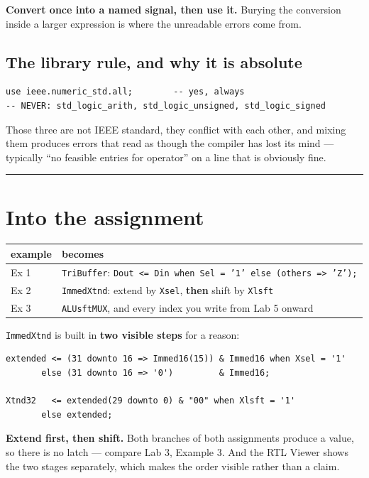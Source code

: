 \documentclass[11pt]{article}
\newcommand{\code}[1]{\texttt{#1}}
\newcommand{\hr}{\vspace{2pt}\hrule\vspace{6pt}}
\begin{document}
\textbf{Convert once into a named signal, then use it.} Burying the conversion
inside a larger expression is where the unreadable errors come from.

\subsection*{The library rule, and why it is absolute}

\begin{lstlisting}
use ieee.numeric_std.all;        -- yes, always
-- NEVER: std_logic_arith, std_logic_unsigned, std_logic_signed
\end{lstlisting}

Those three are not IEEE standard, they conflict with each other, and mixing them
produces errors that read as though the compiler has lost its mind --- typically
``no feasible entries for operator'' on a line that is obviously fine.

\vspace{4pt}\hr

\section*{Into the assignment}

\begin{center}
\begin{tabular}{ll}
\toprule
example & becomes \\
\midrule
Ex 1 & \code{TriBuffer}: \code{Dout <= Din when Sel = '1' else (others => 'Z');} \\
Ex 2 & \code{ImmedXtnd}: extend by \code{Xsel}, \textbf{then} shift by \code{Xlsft} \\
Ex 3 & \code{ALUsftMUX}, and every index you write from Lab 5 onward \\
\bottomrule
\end{tabular}
\end{center}

\code{ImmedXtnd} is built in \textbf{two visible steps} for a reason:

\begin{lstlisting}
extended <= (31 downto 16 => Immed16(15)) & Immed16 when Xsel = '1'
       else (31 downto 16 => '0')         & Immed16;

Xtnd32   <= extended(29 downto 0) & "00" when Xlsft = '1'
       else extended;
\end{lstlisting}

\textbf{Extend first, then shift.} Both branches of both assignments produce a
value, so there is no latch --- compare Lab 3, Example 3. And the RTL Viewer shows
the two stages separately, which makes the order visible rather than a claim.
\end{document}
